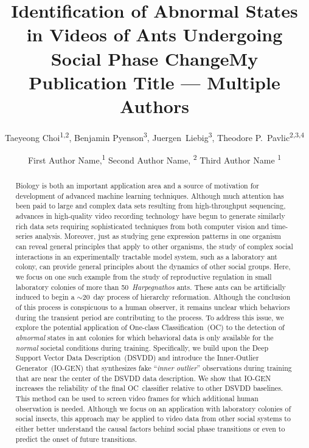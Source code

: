 \documentclass[letterpaper]{article} %
\title{Identification of Abnormal States in Videos of Ants Undergoing Social Phase Change}
\author{
    Taeyeong Choi\textsuperscript{\rm 1,2},
    Benjamin Pyenson\textsuperscript{\rm 3},
    Juergen~Liebig\textsuperscript{\rm 3},
	Theodore P.~Pavlic\textsuperscript{\rm 2,3,4} \\
}
\title{My Publication Title --- Multiple Authors}
\author {

        First Author Name,\textsuperscript{\rm 1}
        Second Author Name, \textsuperscript{\rm 2}
        Third Author Name \textsuperscript{\rm 1} \\
}
\begin{document}
\maketitle

\begin{abstract}
Biology is both an important application area and a source of motivation
for development of advanced machine learning techniques. Although
much attention has been paid to large and complex data sets
resulting from high-throughput sequencing, advances in
high-quality video recording technology have begun to generate
similarly rich data sets requiring sophisticated techniques from both
computer vision and time-series analysis. Moreover, just as studying
gene expression patterns in one organism can reveal general principles
that apply to other organisms, the study of complex social
interactions in an experimentally tractable model system, such as a
laboratory ant colony, can provide general principles about the dynamics
of other social groups. Here, we focus on one such example
from the study of reproductive regulation in small laboratory colonies
of more than 50~\emph{Harpegnathos} ants. These ants can be
artificially induced to begin a $\sim$20~day process of hierarchy
reformation. Although the conclusion of this process is conspicuous to a
human observer, it remains unclear which behaviors during the
transient period are contributing to the process. To address this issue, we
explore the potential application of One-class Classification~(OC) to
the detection of \emph{abnormal} states in ant colonies for which
behavioral data is only available for the \emph{normal} societal
conditions during training. Specifically, we build upon the Deep Support
Vector Data Description~(DSVDD) and introduce the Inner-Outlier
Generator~(\mbox{IO-GEN}) that synthesizes fake ``\emph{inner outlier}''
observations during training that are near the center of the DSVDD data
description. We show that \mbox{IO-GEN} increases the reliability of the final
OC~classifier relative to other DSVDD baselines. This method can be used
to screen video frames for which additional human observation is needed.
Although we focus on an application with laboratory colonies of social
insects, this approach may be applied to video data from other social
systems to either better understand the causal factors behind social
phase transitions or even to predict the onset of future transitions.

\end{abstract}
\end{document}
